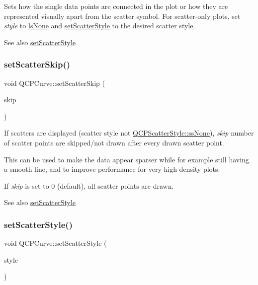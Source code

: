 Sets how the single data points are connected in the plot or how they are represented visually apart from the scatter symbol. For scatter-\/only plots, set {\itshape style} to \hyperlink{classQCPCurve_a2710e9f79302152cff794c6e16cc01f1aec1601a191cdf0b4e761c4c66092cc48}{ls\+None} and \hyperlink{classQCPCurve_a55e43b44709bf50a35500644988aa706}{set\+Scatter\+Style} to the desired scatter style.

\begin{DoxySeeAlso}{See also}
\hyperlink{classQCPCurve_a55e43b44709bf50a35500644988aa706}{set\+Scatter\+Style} 
\end{DoxySeeAlso}
\mbox{\label{classQCPCurve_a97dbfecd497e972d5f2162615e6da5be}} 
\subsubsection{\texorpdfstring{set\+Scatter\+Skip()}{setScatterSkip()}}
{\footnotesize\ttfamily void Q\+C\+P\+Curve\+::set\+Scatter\+Skip (\begin{DoxyParamCaption}\item[{int}]{skip }\end{DoxyParamCaption})}

If scatters are displayed (scatter style not \hyperlink{classQCPScatterStyle_adb31525af6b680e6f1b7472e43859349abd144c291ca274f77053ec68cab6c022}{Q\+C\+P\+Scatter\+Style\+::ss\+None}), {\itshape skip} number of scatter points are skipped/not drawn after every drawn scatter point.

This can be used to make the data appear sparser while for example still having a smooth line, and to improve performance for very high density plots.

If {\itshape skip} is set to 0 (default), all scatter points are drawn.

\begin{DoxySeeAlso}{See also}
\hyperlink{classQCPCurve_a55e43b44709bf50a35500644988aa706}{set\+Scatter\+Style} 
\end{DoxySeeAlso}
\mbox{\label{classQCPCurve_a55e43b44709bf50a35500644988aa706}} 
\subsubsection{\texorpdfstring{set\+Scatter\+Style()}{setScatterStyle()}}
{\footnotesize\ttfamily void Q\+C\+P\+Curve\+::set\+Scatter\+Style (\begin{DoxyParamCaption}\item[{const \hyperlink{classQCPScatterStyle}{Q\+C\+P\+Scatter\+Style} \&}]{style }\end{DoxyParamCaption})}

